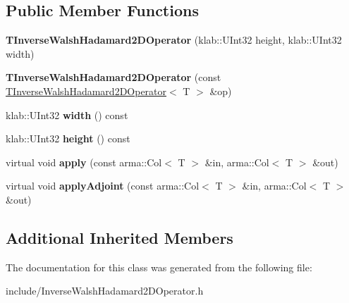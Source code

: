 \subsection*{Public Member Functions}
\begin{DoxyCompactItemize}
\item 
{\bfseries T\+Inverse\+Walsh\+Hadamard2\+D\+Operator} (klab\+::\+U\+Int32 height, klab\+::\+U\+Int32 width)\hypertarget{classkl1p_1_1TInverseWalshHadamard2DOperator_a8339f96e79939333e7028cc91eb75a7f}{}\label{classkl1p_1_1TInverseWalshHadamard2DOperator_a8339f96e79939333e7028cc91eb75a7f}

\item 
{\bfseries T\+Inverse\+Walsh\+Hadamard2\+D\+Operator} (const \hyperlink{classkl1p_1_1TInverseWalshHadamard2DOperator}{T\+Inverse\+Walsh\+Hadamard2\+D\+Operator}$<$ T $>$ \&op)\hypertarget{classkl1p_1_1TInverseWalshHadamard2DOperator_a6f14d31541043e56f1015ab7f72e000f}{}\label{classkl1p_1_1TInverseWalshHadamard2DOperator_a6f14d31541043e56f1015ab7f72e000f}

\item 
klab\+::\+U\+Int32 {\bfseries width} () const \hypertarget{classkl1p_1_1TInverseWalshHadamard2DOperator_ae7c73ff5bc43dbffe1f03ed614b039c6}{}\label{classkl1p_1_1TInverseWalshHadamard2DOperator_ae7c73ff5bc43dbffe1f03ed614b039c6}

\item 
klab\+::\+U\+Int32 {\bfseries height} () const \hypertarget{classkl1p_1_1TInverseWalshHadamard2DOperator_a99a8f5b8ed94fa8d28adbc78ee71844b}{}\label{classkl1p_1_1TInverseWalshHadamard2DOperator_a99a8f5b8ed94fa8d28adbc78ee71844b}

\item 
virtual void {\bfseries apply} (const arma\+::\+Col$<$ T $>$ \&in, arma\+::\+Col$<$ T $>$ \&out)\hypertarget{classkl1p_1_1TInverseWalshHadamard2DOperator_a317ec276590a084ad9c85d3cc97c8b82}{}\label{classkl1p_1_1TInverseWalshHadamard2DOperator_a317ec276590a084ad9c85d3cc97c8b82}

\item 
virtual void {\bfseries apply\+Adjoint} (const arma\+::\+Col$<$ T $>$ \&in, arma\+::\+Col$<$ T $>$ \&out)\hypertarget{classkl1p_1_1TInverseWalshHadamard2DOperator_a16bf40cbb63dd07ed57af0b92128f74d}{}\label{classkl1p_1_1TInverseWalshHadamard2DOperator_a16bf40cbb63dd07ed57af0b92128f74d}

\end{DoxyCompactItemize}
\subsection*{Additional Inherited Members}


The documentation for this class was generated from the following file\+:\begin{DoxyCompactItemize}
\item 
include/Inverse\+Walsh\+Hadamard2\+D\+Operator.\+h\end{DoxyCompactItemize}
